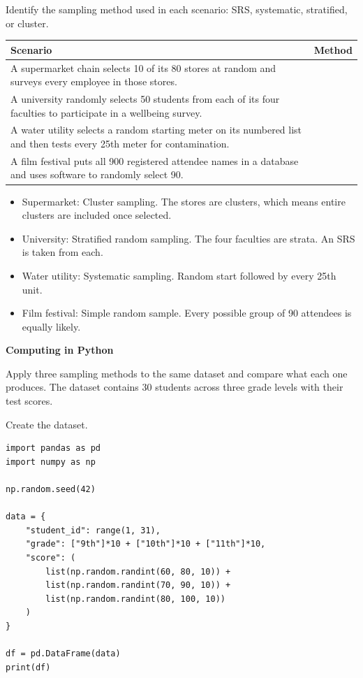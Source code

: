 \begin{Exercise}[title={Identifying Sampling Methods}, label={ex:samplingid}]
Identify the sampling method used in each scenario: SRS, systematic, stratified, or cluster.

\medskip
\begin{tabular}{|p{}|p{}|}
\hline
Scenario & Method \\
\hline
A supermarket chain selects 10 of its 80 stores at random and surveys every employee in those stores. & \\[2em]
\hline
A university randomly selects 50 students from each of its four faculties to participate in a wellbeing survey. & \\[2em]
\hline
A water utility selects a random starting meter on its numbered list and then tests every 25th meter for contamination. & \\[2em]
\hline
A film festival puts all 900 registered attendee names in a database and uses software to randomly select 90. & \\[2em]
\hline
\end{tabular}
\end{Exercise}
\begin{Answer}[ref={ex:samplingid}]
\begin{itemize}
    \item Supermarket: Cluster sampling. The stores are clusters, which means entire clusters are included once selected.
    \item University: Stratified random sampling. The four faculties are strata. An SRS is taken from each.
    \item Water utility: Systematic sampling. Random start followed by every 25th unit.
    \item Film festival: Simple random sample. Every possible group of 90 attendees is equally likely.
\end{itemize}


\end{Answer}

\textbf{Computing in Python}

Apply three sampling methods to the same dataset and compare what each one produces. The dataset contains 30 students across three grade levels with their test scores.

Create the dataset.

\begin{verbatim}
import pandas as pd
import numpy as np

np.random.seed(42)

data = {
    "student_id": range(1, 31),
    "grade": ["9th"]*10 + ["10th"]*10 + ["11th"]*10,
    "score": (
        list(np.random.randint(60, 80, 10)) +
        list(np.random.randint(70, 90, 10)) +
        list(np.random.randint(80, 100, 10))
    )
}

df = pd.DataFrame(data)
print(df)
\end{verbatim}

